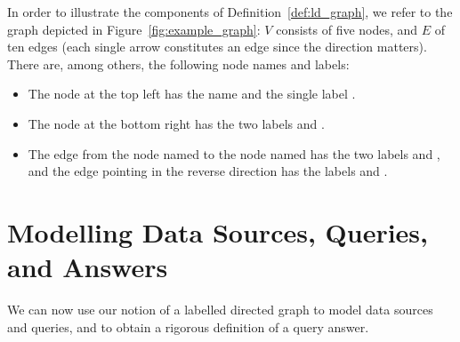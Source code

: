 In order to illustrate the components of Definition~\ref{def:ld_graph},
we refer to the graph depicted in Figure~\ref{fig:example_graph}:
$V$ consists of five nodes, and $E$ of ten edges
(each single arrow constitutes an edge since the direction matters).
There are, among others, the following node names and labels:
%
\begin{itemize}
  \item
    The node at the top left has the name 
    and the single label .
  \item 
    The node at the bottom right has the two labels  and .
  \item 
    The edge from the node named  to the node named 
    has the two labels  and ,
    and the edge pointing in the reverse direction has the labels
     and .
\end{itemize}
%

\section{Modelling Data Sources, Queries, and Answers}
\label{sec:modelling}

We can now use our notion of a labelled directed graph to model
data sources and queries, and to obtain a rigorous definition of a query answer.

